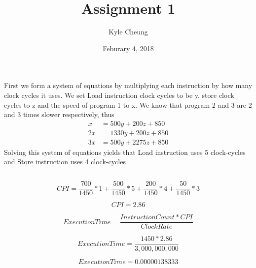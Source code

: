\documentclass{article}
\title{Assignment 1}
\date{Feburary 4, 2018}
\author{Kyle Cheung}
\begin{document}
\maketitle
{}
\newpage
{}

\section{}
\subsection{}

First we form a system of equations by multiplying each instruction by how many clock cycles it uses. We set Load instruction clock cycles to be y, store clock cycles to z and the speed of program 1 to x. We know that program 2 and 3 are 2 and 3 times slower respectively, thus
\begin{align*}
  x &= 500y + 200z + 850\\
  2x &= 1330y + 200z + 850\\
  3x &= 500y + 2275z + 850
\end{align*}
Solving this system of equations yields that Load instruction uses 5 clock-cycles and Store instruction uses 4 clock-cycles

\subsection{}
\begin{equation*}
  CPI = \frac{700}{1450} * 1 + \frac{500}{1450} * 5 + \frac{200}{1450} * 4 + \frac{50}{1450} * 3
\end{equation*}

\begin{equation*}
  CPI = 2.86
\end{equation*}

\begin{equation*}
  Execution Time = \frac{Instruction Count * CPI}{Clock Rate}
\end{equation*}

\begin{equation*}
  Execution Time = \frac{1450 * 2.86}{3,000,000,000}
\end{equation*}

\begin{equation*}
  Execution Time = 0.00000138333
\end{equation*}

\subsection{}
\end{document}
